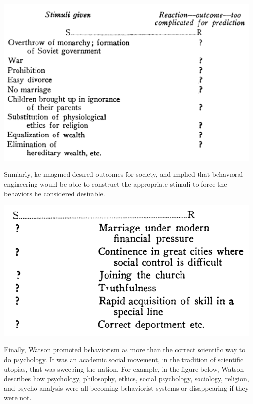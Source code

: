 \documentclass[
  oneside,
  12pt]{crumpbook}
\begin{document}
\begin{center}\includegraphics[width=1\linewidth]{imgs/Watson_Society_S} \end{center}

Similarly, he imagined desired outcomes for society, and implied that behavioral engineering would be able to construct the appropriate stimuli to force the behaviors he considered desirable.

\begin{center}\includegraphics[width=1\linewidth]{imgs/Watson_Society_R} \end{center}

Finally, Watson promoted behaviorism as more than the correct scientific way to do psychology. It was an academic social movement, in the tradition of scientific utopias, that was sweeping the nation. For example, in the figure below, Watson describes how psychology, philosophy, ethics, social psychology, sociology, religion, and psycho-analysis were all becoming behaviorist systems or disappearing if they were not.
\end{document}
